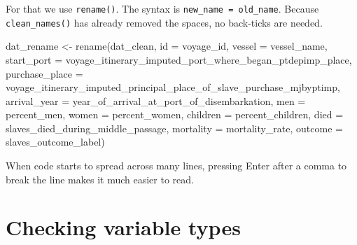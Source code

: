 \documentclass[
  english,
  letterpaper,
]{book}
\newenvironment{Shaded}{\begin{snugshade}}{\end{snugshade}}
\newcommand{\AttributeTok}[1]{\textcolor[rgb]{0.40,0.45,0.13}{#1}}
\newcommand{\FunctionTok}[1]{\textcolor[rgb]{0.28,0.35,0.67}{#1}}
\newcommand{\NormalTok}[1]{\textcolor[rgb]{0.00,0.23,0.31}{#1}}
\newcommand{\OtherTok}[1]{\textcolor[rgb]{0.00,0.23,0.31}{#1}}
\begin{document}
For that we use \texttt{rename()}. The syntax is
\texttt{new\_name\ =\ old\_name}. Because \texttt{clean\_names()} has
already removed the spaces, no back-ticks are needed.

\begin{Shaded}
\begin{Highlighting}[]
\NormalTok{dat\_rename }\OtherTok{\textless{}{-}} \FunctionTok{rename}\NormalTok{(dat\_clean,}
                     \AttributeTok{id =}\NormalTok{ voyage\_id,}
                     \AttributeTok{vessel =}\NormalTok{ vessel\_name,}
                     \AttributeTok{start\_port =}\NormalTok{ voyage\_itinerary\_imputed\_port\_where\_began\_ptdepimp\_place,}
                     \AttributeTok{purchase\_place =}\NormalTok{ voyage\_itinerary\_imputed\_principal\_place\_of\_slave\_purchase\_mjbyptimp,}
                     \AttributeTok{arrival\_year =}\NormalTok{ year\_of\_arrival\_at\_port\_of\_disembarkation,}
                     \AttributeTok{men =}\NormalTok{ percent\_men,}
                     \AttributeTok{women =}\NormalTok{ percent\_women,}
                     \AttributeTok{children =}\NormalTok{ percent\_children,}
                     \AttributeTok{died =}\NormalTok{ slaves\_died\_during\_middle\_passage,}
                     \AttributeTok{mortality =}\NormalTok{ mortality\_rate,}
                     \AttributeTok{outcome =}\NormalTok{ slaves\_outcome\_label)}
\end{Highlighting}
\end{Shaded}

\begin{tcolorbox}[enhanced jigsaw, colframe=quarto-callout-tip-color-frame, breakable, left=2mm, leftrule=.75mm, toptitle=1mm, rightrule=.15mm, opacitybacktitle=0.6, arc=.35mm, colback=white, title=\textcolor{quarto-callout-tip-color}{\faLightbulb}\hspace{0.5em}{Tip}, coltitle=black, colbacktitle=quarto-callout-tip-color!10!white, toprule=.15mm, bottomtitle=1mm, opacityback=0, titlerule=0mm, bottomrule=.15mm]

When code starts to spread across many lines, pressing Enter after a
comma to break the line makes it much easier to read.

\end{tcolorbox}

\section{Checking variable types}\label{checking-variable-types}
\end{document}
